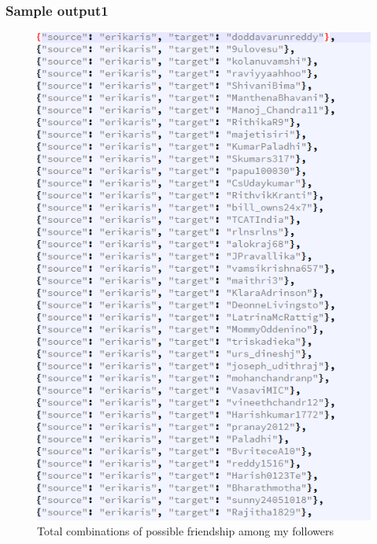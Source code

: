 \subsubsection{Sample output1}
\begin{figure}[ht]    
    \begin{center}
        \includegraphics[scale=0.6]{sample_f1.png}
        \caption{Total combinations of possible friendship among my followers}
        \label{Sample_list2}
    \end{center}
\end{figure}
\newpage


